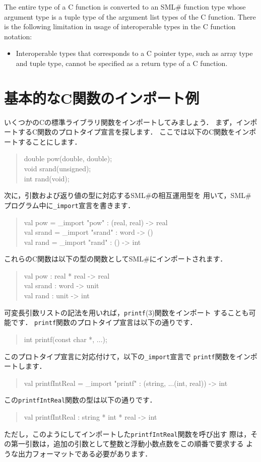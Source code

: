 \documentclass{jbook}
\newif\ifjp
\newcommand{\txt}[2]{#1}
\newcommand{\smlsharp}{SML\#}
\newenvironment{program}{\begin{quote}\begin{tt}}%
                        {\end{tt}\end{quote}}
\begin{document}
	The entire type of a C function is converted to an \smlsharp{}
function type whose argument type is a tuple type of the argument list types
of the C function.
	There is the following limitation in usage of interoperable types
in the C function notation:
\begin{itemize}
\item
	Interoperable types that corresponds to a C pointer type, such as
array type and tuple type, cannot be specified as a return type of
a C function.
\end{itemize}

\fi%

\section{\txt{基本的なC関数のインポート例}
             {Basic examples of importing C functions}}

\ifjp%

	いくつかのCの標準ライブラリ関数をインポートしてみましょう．
	まず，インポートするC関数のプロトタイプ宣言を探します．
	ここでは以下のC関数をインポートすることにします．
\begin{program}
double pow(double, double);\\
void srand(unsigned);\\
int rand(void);
\end{program}
	次に，引数および返り値の型に対応する\smlsharp{}の相互運用型を
用いて，\smlsharp{}プログラム中に{\tt \_import}宣言を書きます．
\begin{program}
val pow = \_import "pow" : (real, real) -> real\\
val srand = \_import "srand" : word -> ()\\
val rand = \_import "rand" : () -> int
\end{program}
	これらのC関数は以下の型の関数として\smlsharp{}にインポートされます．
\begin{program}
val pow : real * real -> real\\
val srand : word -> unit\\
val rand : unit -> int
\end{program}

	可変長引数リストの記法を用いれば，{\tt printf}(3)関数をインポート
することも可能です．
	{\tt printf}関数のプロトタイプ宣言は以下の通りです．
\begin{program}
int printf(const char *, ...);
\end{program}
	このプロトタイプ宣言に対応付けて，以下の{\tt \_import}宣言で
{\tt printf}関数をインポートします．
\begin{program}
val printfIntReal = \_import "printf" : (string, ...(int, real)) -> int
\end{program}
	この{\tt printfIntReal}関数の型は以下の通りです．
\begin{program}
val printfIntReal : string * int * real -> int
\end{program}
	ただし，このようにしてインポートした{\tt printfIntReal}関数を呼び出す
際は，その第一引数は，追加の引数として整数と浮動小数点数をこの順番で要求する
ような出力フォーマットである必要があります．
\end{document}
